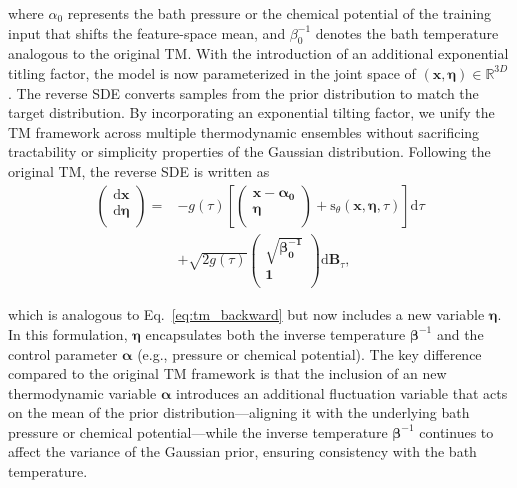 \documentclass[aip,jcp,reprint,longbibliography]{revtex4-1}
\begin{document}
\noindent where $\alpha_0$ represents the bath pressure or the chemical potential of the training input that shifts the feature-space mean, and $\beta_0^{-1}$ denotes the bath temperature analogous to the original TM. With the introduction of an additional exponential titling factor, the model is now parameterized in the joint space of $(\mathbf{x},\boldsymbol{\eta} ) \in \mathbb{R}^{3D}$. The reverse SDE converts samples from the prior distribution to match the target distribution. By incorporating an exponential tilting factor, we unify the TM framework across multiple thermodynamic ensembles without sacrificing tractability or simplicity properties of the Gaussian distribution. Following the original TM, the reverse SDE is written as
\begin{equation}
\begin{aligned}
\begin{pmatrix}
\mathrm{d}\mathbf{x}\\
\mathrm{d}\boldsymbol{\eta}\\
\end{pmatrix}
=& 
-g(\tau)\left[
\begin{pmatrix}
\mathbf{x}-\boldsymbol{\alpha_0}\\\boldsymbol{\eta}\\
\end{pmatrix}
+ \mathrm{s}_\theta(\mathbf{x},\boldsymbol{\eta}, \tau)
\right]
\mathrm{d}\tau \\
& + \sqrt{2 g(\tau)} 
\begin{pmatrix}
\sqrt{\boldsymbol{\beta_0^{-1}}} \\
\mathbf{1}\\
\end{pmatrix}
\mathrm{d}\mathbf{B}_\tau,
 \label{eq:tilting_backward}
\end{aligned}
\end{equation}

\noindent which is analogous to Eq.~\ref{eq:tm_backward} but now includes a new variable $\boldsymbol{\eta}$.
In this formulation, $\boldsymbol{\eta}$ encapsulates both the inverse temperature $\boldsymbol{\beta}^{-1}$ and the control parameter $\boldsymbol{\alpha}$ (e.g., pressure or chemical potential). 
The key difference compared to the original TM framework is that the inclusion of an new thermodynamic variable $\boldsymbol{\alpha}$ introduces an additional fluctuation variable that acts on the mean of the prior distribution—aligning it with the underlying bath pressure or chemical potential—while the inverse temperature $\boldsymbol{\beta}^{-1}$ continues to affect the variance of the Gaussian prior, ensuring consistency with the bath temperature.
\end{document}
